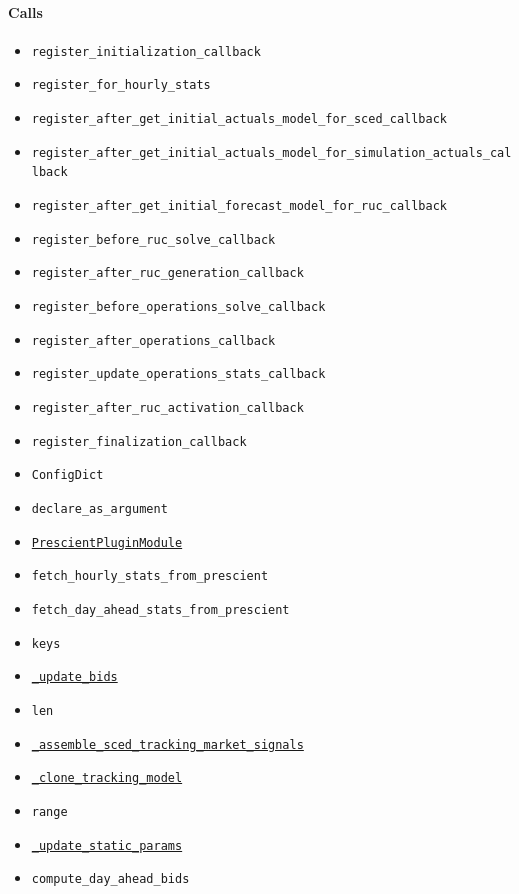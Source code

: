 \documentclass[11pt]{report}
\begin{document}
\paragraph{Calls}
\begin{itemize}[leftmargin=*]
  \item \texttt{register\_initialization\_callback}
  \item \texttt{register\_for\_hourly\_stats}
  \item \texttt{register\_after\_get\_initial\_actuals\_model\_for\_sced\_callback}
  \item \texttt{register\_after\_get\_initial\_actuals\_model\_for\_simulation\_actuals\_callback}
  \item \texttt{register\_after\_get\_initial\_forecast\_model\_for\_ruc\_callback}
  \item \texttt{register\_before\_ruc\_solve\_callback}
  \item \texttt{register\_after\_ruc\_generation\_callback}
  \item \texttt{register\_before\_operations\_solve\_callback}
  \item \texttt{register\_after\_operations\_callback}
  \item \texttt{register\_update\_operations\_stats\_callback}
  \item \texttt{register\_after\_ruc\_activation\_callback}
  \item \texttt{register\_finalization\_callback}
  \item \texttt{ConfigDict}
  \item \texttt{declare\_as\_argument}
  \item \hyperref[def:coordinator.py:PrescientPluginModule:L24]{\texttt{PrescientPluginModule}}
  \item \texttt{fetch\_hourly\_stats\_from\_prescient}
  \item \texttt{fetch\_day\_ahead\_stats\_from\_prescient}
  \item \texttt{keys}
  \item \hyperref[def:coordinator.py:DoubleLoopCoordinator._update_bids:L187]{\texttt{\_update\_bids}}
  \item \texttt{len}
  \item \hyperref[def:coordinator.py:DoubleLoopCoordinator._assemble_sced_tracking_market_signals:L683]{\texttt{\_assemble\_sced\_tracking\_market\_signals}}
  \item \hyperref[def:coordinator.py:DoubleLoopCoordinator._clone_tracking_model:L366]{\texttt{\_clone\_tracking\_model}}
  \item \texttt{range}
  \item \hyperref[def:coordinator.py:DoubleLoopCoordinator._update_static_params:L399]{\texttt{\_update\_static\_params}}
  \item \texttt{compute\_day\_ahead\_bids}
\end{itemize}
\end{document}
